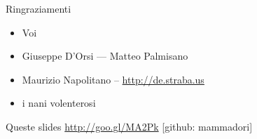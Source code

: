 \documentclass[italian,compress,red]{beamer}
\begin{document}
\begin{frame}[<+->]{Ringraziamenti}
 \begin{itemize}
  \item Voi
  \item Giuseppe D'Orsi --- Matteo Palmisano
  \item Maurizio Napolitano -- \url{http://de.straba.us}
  \item i nani volenterosi
 \end{itemize}
 
  \begin{block}{Queste slides}
  \url{http://goo.gl/MA2Pk} [github: mammadori]
  \end{block}
 
\end{frame}
\end{document}
